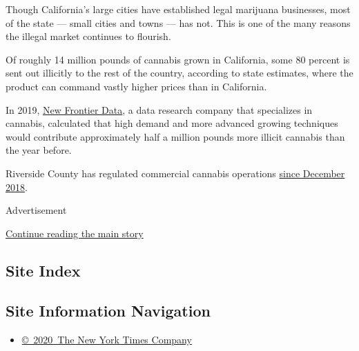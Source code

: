 Though California's large cities have established legal marijuana
businesses, most of the state --- small cities and towns --- has not.
This is one of the many reasons the illegal market continues to
flourish.

Of roughly 14 million pounds of cannabis grown in California, some 80
percent is sent out illicitly to the rest of the country, according to
state estimates, where the product can command vastly higher prices than
in California.

In 2019, \href{https://newfrontierdata.com/}{New Frontier Data}, a data
research company that specializes in cannabis, calculated that high
demand and more advanced growing techniques would contribute
approximately half a million pounds more illicit cannabis than the year
before.

Riverside County has regulated commercial cannabis operations
\href{https://planning.rctlma.org/Cannabis}{since December 2018}.

Advertisement

\protect\hyperlink{after-bottom}{Continue reading the main story}

\hypertarget{site-index}{%
\subsection{Site Index}\label{site-index}}

\hypertarget{site-information-navigation}{%
\subsection{Site Information
Navigation}\label{site-information-navigation}}

\begin{itemize}
\tightlist
\item
  \href{https://help.nytimes3xbfgragh.onion/hc/en-us/articles/115014792127-Copyright-notice}{©~2020~The
  New York Times Company}
\end{itemize}

